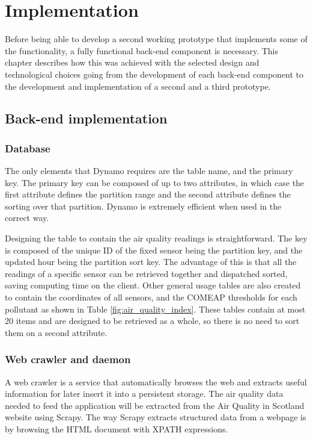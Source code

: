 \chapter{Implementation}
Before being able to develop a second working prototype that implements some of the functionality, a fully functional back-end component is necessary. This chapter describes how this was achieved with the selected design and technological choices going from the development of each back-end component to the development and implementation of a second and a third prototype.
\section{Back-end implementation}

\subsection{Database}
The only elements that Dynamo requires are the table name, and the primary key. The primary key can be composed of up to two attributes, in which case the first attribute defines the partition range and the second attribute defines the sorting over that partition. Dynamo is extremely efficient when used in the correct way. 

Designing the table to contain the air quality readings is straightforward. The key is composed of the unique ID of the fixed sensor being the partition key, and the updated hour being the partition sort key. The advantage of this is that all the readings of a specific sensor can be retrieved together and dispatched sorted, saving computing time on the client. Other general usage tables are also created to contain the coordinates of all sensors, and the COMEAP thresholds for each pollutant as shown in Table \ref{fig:air_quality_index}. These tables contain at most 20 items and are designed to be retrieved as a whole, so there is no need to sort them on a second attribute.

\subsection{Web crawler and daemon}
A web crawler is a service that automatically browses the web and extracts useful information for later insert it into a persistent storage. The air quality data needed to feed the application will be extracted from the Air Quality in Scotland website using Scrapy. The way Scrapy extracts structured data from a webpage is by browsing the HTML document with XPATH expressions. 

